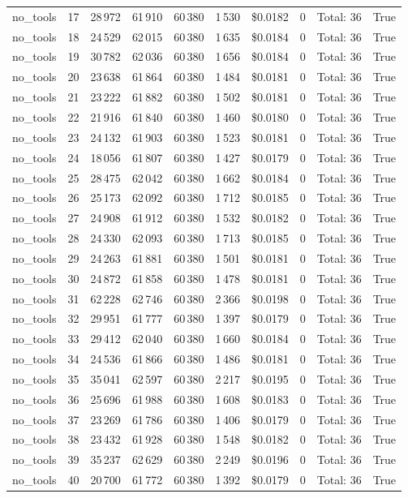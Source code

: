 \documentclass[a4paper,11pt]{article}
\begin{document}
\begin{table}[H]
{\begin{tabular}{l r r r r r r r l r}
no\_tools & 17 & 28\,972 & 61\,910 & 60\,380 & 1\,530 & \$0.0182 & 0 & Total: 36 & True \\
no\_tools & 18 & 24\,529 & 62\,015 & 60\,380 & 1\,635 & \$0.0184 & 0 & Total: 36 & True \\
no\_tools & 19 & 30\,782 & 62\,036 & 60\,380 & 1\,656 & \$0.0184 & 0 & Total: 36 & True \\
no\_tools & 20 & 23\,638 & 61\,864 & 60\,380 & 1\,484 & \$0.0181 & 0 & Total: 36 & True \\
no\_tools & 21 & 23\,222 & 61\,882 & 60\,380 & 1\,502 & \$0.0181 & 0 & Total: 36 & True \\
no\_tools & 22 & 21\,916 & 61\,840 & 60\,380 & 1\,460 & \$0.0180 & 0 & Total: 36 & True \\
no\_tools & 23 & 24\,132 & 61\,903 & 60\,380 & 1\,523 & \$0.0181 & 0 & Total: 36 & True \\
no\_tools & 24 & 18\,056 & 61\,807 & 60\,380 & 1\,427 & \$0.0179 & 0 & Total: 36 & True \\
no\_tools & 25 & 28\,475 & 62\,042 & 60\,380 & 1\,662 & \$0.0184 & 0 & Total: 36 & True \\
no\_tools & 26 & 25\,173 & 62\,092 & 60\,380 & 1\,712 & \$0.0185 & 0 & Total: 36 & True \\
no\_tools & 27 & 24\,908 & 61\,912 & 60\,380 & 1\,532 & \$0.0182 & 0 & Total: 36 & True \\
no\_tools & 28 & 24\,330 & 62\,093 & 60\,380 & 1\,713 & \$0.0185 & 0 & Total: 36 & True \\
no\_tools & 29 & 24\,263 & 61\,881 & 60\,380 & 1\,501 & \$0.0181 & 0 & Total: 36 & True \\
no\_tools & 30 & 24\,872 & 61\,858 & 60\,380 & 1\,478 & \$0.0181 & 0 & Total: 36 & True \\
no\_tools & 31 & 62\,228 & 62\,746 & 60\,380 & 2\,366 & \$0.0198 & 0 & Total: 36 & True \\
no\_tools & 32 & 29\,951 & 61\,777 & 60\,380 & 1\,397 & \$0.0179 & 0 & Total: 36 & True \\
no\_tools & 33 & 29\,412 & 62\,040 & 60\,380 & 1\,660 & \$0.0184 & 0 & Total: 36 & True \\
no\_tools & 34 & 24\,536 & 61\,866 & 60\,380 & 1\,486 & \$0.0181 & 0 & Total: 36 & True \\
no\_tools & 35 & 35\,041 & 62\,597 & 60\,380 & 2\,217 & \$0.0195 & 0 & Total: 36 & True \\
no\_tools & 36 & 25\,696 & 61\,988 & 60\,380 & 1\,608 & \$0.0183 & 0 & Total: 36 & True \\
no\_tools & 37 & 23\,269 & 61\,786 & 60\,380 & 1\,406 & \$0.0179 & 0 & Total: 36 & True \\
no\_tools & 38 & 23\,432 & 61\,928 & 60\,380 & 1\,548 & \$0.0182 & 0 & Total: 36 & True \\
no\_tools & 39 & 35\,237 & 62\,629 & 60\,380 & 2\,249 & \$0.0196 & 0 & Total: 36 & True \\
no\_tools & 40 & 20\,700 & 61\,772 & 60\,380 & 1\,392 & \$0.0179 & 0 & Total: 36 & True \\
\bottomrule
\end{tabular}}
\end{table}
\end{document}
